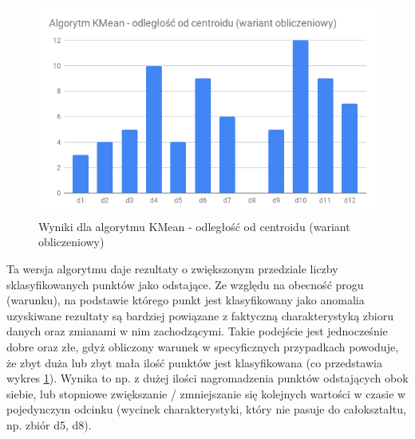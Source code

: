 \documentclass[eng,printmode]{mgr}
\begin{document}
\begin{figure}[H]
  \begin{center}
  \includegraphics[scale=0.7]{r_dist_c}
  \end{center}
  \caption{Wyniki dla algorytmu KMean - odległość od centroidu (wariant obliczeniowy)}
  \label{fig:r_dist_c}
\end{figure}

Ta wersja algorytmu daje rezultaty o zwiększonym przedziale liczby sklasyfikowanych punktów jako odstające. Ze względu na obecność progu (warunku), na podstawie którego punkt jest klasyfikowany jako anomalia uzyskiwane rezultaty są bardziej powiązane z faktyczną charakterystyką zbioru danych oraz zmianami w nim zachodzącymi. Takie podejście jest jednocześnie dobre oraz złe, gdyż obliczony warunek w specyficznych przypadkach powoduje, że zbyt duża lub zbyt mała ilość punktów jest klasyfikowana (co przedstawia wykres \ref{fig:r_dist_c}). Wynika to np. z dużej ilości nagromadzenia punktów odstających obok siebie, lub stopniowe zwiększanie / zmniejszanie się kolejnych wartości w czasie w pojedynczym odcinku (wycinek charakterystyki, który nie pasuje do całokształtu, np. zbiór d5, d8).
\end{document}
